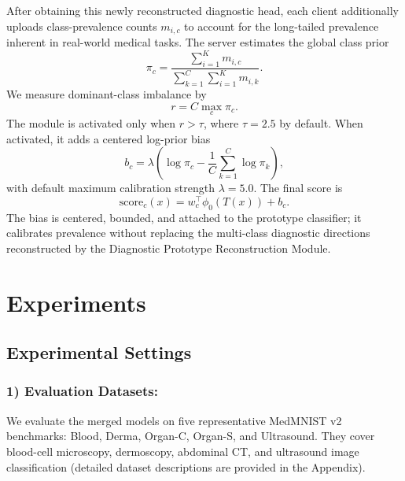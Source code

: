 \documentclass[letterpaper]{article} %
\begin{document}
After obtaining this newly reconstructed diagnostic head, each client additionally uploads class-prevalence counts $m_{i,c}$ to account for the long-tailed prevalence inherent in real-world medical tasks. The server estimates the global class prior
\begin{equation}
\pi_c=\frac{\sum_{i=1}^{K}m_{i,c}}{\sum_{k=1}^{C}\sum_{i=1}^{K}m_{i,k}}.
\end{equation}
We measure dominant-class imbalance by
\begin{equation}
r=C\max_c \pi_c.
\end{equation}
The module is activated only when $r>\tau$, where $\tau=2.5$ by default. When activated, it adds a centered log-prior bias
\begin{equation}
b_c=\lambda\left(\log\pi_c-\frac{1}{C}\sum_{k=1}^{C}\log\pi_k\right),
\end{equation}
with default maximum calibration strength $\lambda=5.0$. The final score is
\begin{equation}
\mathrm{score}_c(x)=w_c^\top\phi_0(T(x))+b_c.
\end{equation}
The bias is centered, bounded, and attached to the prototype classifier; it calibrates prevalence without replacing the multi-class diagnostic directions reconstructed by the Diagnostic Prototype Reconstruction Module.

\section{Experiments}

\subsection{Experimental Settings}

\subsubsection{1) Evaluation Datasets:}

We evaluate the merged models on five representative MedMNIST v2 benchmarks\cite{yang2023medmnist}: Blood, Derma, Organ-C, Organ-S, and Ultrasound. They cover blood-cell microscopy, dermoscopy, abdominal CT, and ultrasound image classification (detailed dataset descriptions are provided in the Appendix).
\end{document}
